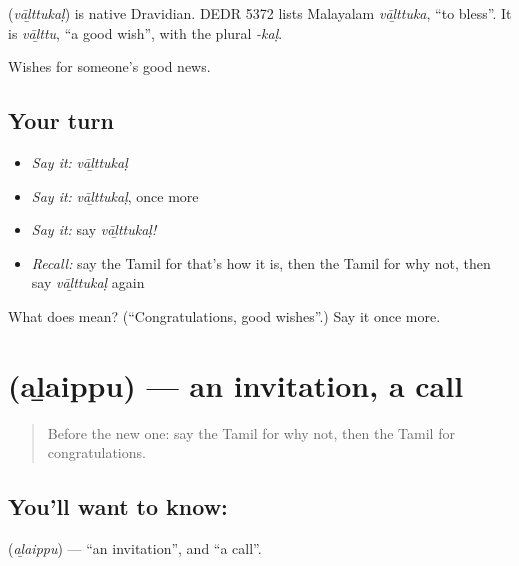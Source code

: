 \begin{cousinweb}
\textbf{} (\emph{vāḻttukaḷ}) is native Dravidian. DEDR 5372 lists Malayalam \emph{vāḻttuka}, \textquotedblleft{}to bless\textquotedblright{}. It is \emph{vāḻttu}, \textquotedblleft{}a good wish\textquotedblright{}, with the plural \emph{-kaḷ}.
\end{cousinweb}

\begin{grammarlens}[title={What you've built}]
Wishes for someone's good news.
\end{grammarlens}

\subsection*{Your turn}
\begin{itemize}
\raggedright
  \item \emph{Say it:} \emph{vāḻttukaḷ}
  \item \emph{Say it:} \emph{vāḻttukaḷ}, once more
  \item \emph{Say it:} say \emph{vāḻttukaḷ!}
  \item \emph{Recall:} say the Tamil for that's how it is, then the Tamil for why not, then say \emph{vāḻttukaḷ} again
\end{itemize}

\begin{tcolorbox}[breakable,colback=teal!4,colframe=teal!35!black,title={Before you move on}]
What does  mean? (\textquotedblleft{}Congratulations, good wishes\textquotedblright{}.) Say it once more.
\end{tcolorbox}
\section[\texorpdfstring{\ta{அழைப்பு} (aḻaippu)}{அழைப்பு (aḻaippu)}]{ (aḻaippu) — an invitation, a call}

\label{lesson:TA-C98-invitation}



\begin{quote}
Before the new one: say the Tamil for why not, then the Tamil for congratulations.
\end{quote}

\subsection*{You'll want to know: }
\textbf{} (\emph{aḻaippu}) — \textquotedblleft{}an invitation\textquotedblright{}, and \textquotedblleft{}a call\textquotedblright{}.

